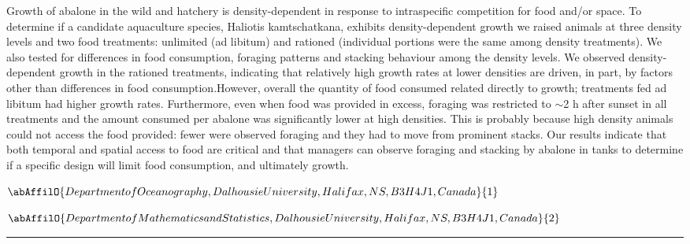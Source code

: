 \noindent Growth of abalone in the wild and hatchery is density-dependent in response to intraspecific competition for food and/or space. To determine if a candidate aquaculture species, Haliotis kamtschatkana, exhibits density-dependent growth we raised animals at three density levels and two food treatments: unlimited (ad libitum) and rationed (individual portions were the same among density treatments). We also tested for differences in food consumption, foraging patterns and stacking behaviour among the density levels. We observed density-dependent growth in the rationed treatments, indicating that relatively high growth rates at lower densities are driven, in part, by factors other than differences in food consumption.However, overall the quantity of food consumed related directly to growth; treatments fed ad libitum had higher growth rates. Furthermore, even when food was provided in excess, foraging was restricted to $\sim$2 h after sunset in all treatments and the amount consumed per abalone was significantly lower at high densities. This is probably because high density animals could not access the food provided: fewer were observed foraging and they had to move from prominent stacks. Our results indicate that both temporal and spatial access to food are critical and that managers can observe foraging and stacking by abalone in tanks to determine if a specific design will limit food consumption, and ultimately growth.

\begin{center}
   \vspace{2 mm} \begin{center}
    \vspace{2 mm}\begin{center}
  
  $\abAffilO{Department of Oceanography, Dalhousie University, Halifax, NS, B3H 4J1, Canada}{1}$

  
  $\abAffilO{Department of Mathematics and Statistics, Dalhousie University, Halifax, NS, B3H 4J1, Canada}{2}$

  \end{center}
  \vspace{2 mm}
  \end{center}\end{center}
  \begin{center}\rule{0.70\linewidth}{0.5 pt}\end{center}

